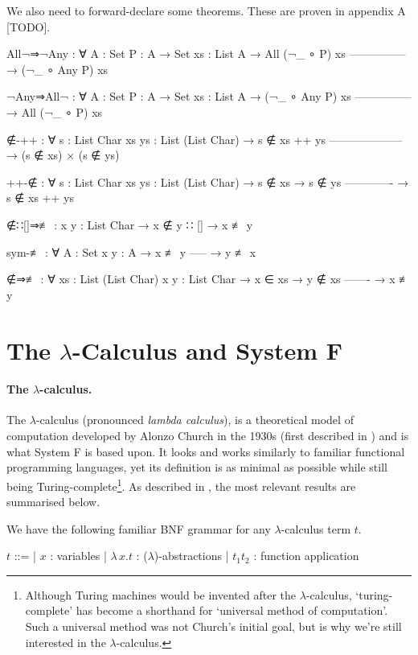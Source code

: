 \documentclass[logo,bsc,singlespacing,parskip,online]{infthesis}
\renewenvironment{code}{\mintedcopy[breaklines]{agda}}{\endmintedcopy}
\begin{document}
We also need to forward-declare some theorems. These are proven in appendix A [TODO].

\begin{code}
All¬⇒¬Any : ∀ {A : Set} {P : A → Set} {xs : List A}
  → All (¬_ ∘ P) xs
    ---------------
  → (¬_ ∘ Any P) xs

¬Any⇒All¬ : ∀ {A : Set} {P : A → Set} {xs : List A}
  → (¬_ ∘ Any P) xs
    ---------------
  → All (¬_ ∘ P) xs

∉-++ : ∀ {s : List Char} {xs ys : List (List Char)}
  → s ∉ xs ++ ys
    --------------------
  → (s ∉ xs) × (s ∉ ys)

++-∉ : ∀ {s : List Char} {xs ys : List (List Char)}
  → s ∉ xs
  → s ∉ ys
    -------------
  → s ∉ xs ++ ys

∉∷[]⇒≢ : {x y : List Char} → x ∉ y ∷ [] → x ≢ y

sym-≢ : ∀ {A : Set} {x y : A}
  → x ≢ y
    -----
  → y ≢ x

∉⇒≢ : ∀ {xs : List (List Char)} {x y : List Char}
  → x ∈ xs
  → y ∉ xs
    -------
  → x ≢ y

\end{code}

\section{The $\lambda$-Calculus and System F}

\paragraph*{The $\lambda$-calculus.} The $\lambda$-calculus (pronounced
\textit{lambda calculus}), is a theoretical model of computation developed by
Alonzo Church in the 1930s (first described in \citet{church_set_1932}) and is
what System F is based upon. It looks and works similarly to familiar functional
programming languages, yet its definition is as minimal as possible while still
being Turing-complete\footnote{Although Turing machines would be invented after
the $\lambda$-calculus, `turing-complete' has become a shorthand for `universal
method of computation'. Such a universal method was not Church's initial goal,
but is why we're still interested in the $\lambda$-calculus.}. As described in
\cite{pierce_types_2002}, the most relevant results are summarised below.

We have the following familiar BNF grammar for any $\lambda$-calculus term $t$.

\begin{center}
\begin{bnf}
  $t$ ::=
  | $x$ : variables
  | $\lambda \, x. t$ : ($\lambda$)-abstractions
  | $t_1 t_2$ : function application
\end{bnf}
\end{center}
\end{document}
